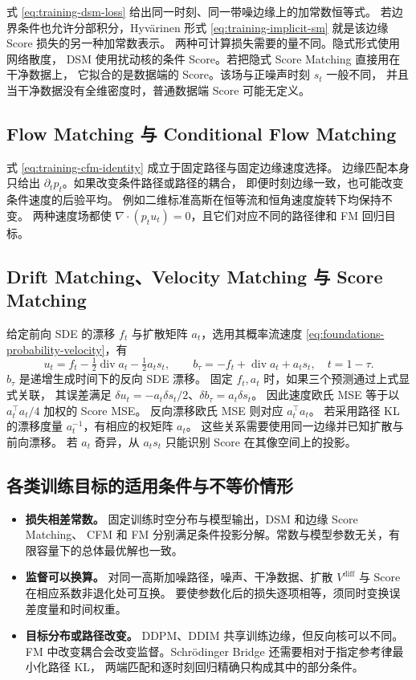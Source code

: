 式 \eqref{eq:training-dsm-loss} 给出同一时刻、同一带噪边缘上的加常数恒等式。
若边界条件也允许分部积分，Hyvärinen 形式 \eqref{eq:training-implicit-sm}
就是该边缘 Score 损失的另一种加常数表示。
两种可计算损失需要的量不同。隐式形式使用网络散度，
DSM 使用扰动核的条件 Score。若把隐式 Score Matching 直接用在干净数据上，
它拟合的是数据端的 Score。该场与正噪声时刻 \(s_t\) 一般不同，
并且当干净数据没有全维密度时，普通数据端 Score 可能无定义。

\subsection{Flow Matching 与 Conditional Flow Matching}

式 \eqref{eq:training-cfm-identity} 成立于固定路径与固定边缘速度选择。
边缘匹配本身只给出 \(\partial_t p_t\)。如果改变条件路径或路径的耦合，
即便时刻边缘一致，也可能改变条件速度的后验平均。
例如二维标准高斯在恒等流和恒角速度旋转下均保持不变。
两种速度场都使 \(\nabla\cdot(p_tu_t)=0\)，且它们对应不同的路径律和 FM 回归目标。

\subsection{Drift Matching、Velocity Matching 与 Score Matching}

给定前向 SDE 的漂移 \(f_t\) 与扩散矩阵 \(a_t\)，选用其概率流速度
\eqref{eq:foundations-probability-velocity}，有
\begin{equation}
  u_t=f_t-\tfrac12\operatorname{div}a_t-\tfrac12a_t s_t,
  \qquad
  b_\tau=-f_t+\operatorname{div}a_t+a_t s_t,\quad t=1-\tau .
  \label{eq:training-drift-score}
\end{equation}
\(b_\tau\) 是递增生成时间下的反向 SDE 漂移。
固定 \(f_t,a_t\) 时，如果三个预测通过上式显式关联，
其误差满足 \(\delta u_t=-a_t\delta s_t/2\)、\(\delta b_\tau=a_t\delta s_t\)。
因此速度欧氏 MSE 等于以 \(a_t^\top a_t/4\) 加权的 Score MSE。
反向漂移欧氏 MSE 则对应 \(a_t^\top a_t\)。
若采用路径 KL 的漂移度量 \(a_t^{-1}\)，有相应的权矩阵 \(a_t\)。
这些关系需要使用同一边缘并已知扩散与前向漂移。
若 \(a_t\) 奇异，从 \(a_t s_t\) 只能识别 Score 在其像空间上的投影。

\subsection{各类训练目标的适用条件与不等价情形}

\begin{itemize}[leftmargin=2em]
  \item \textbf{损失相差常数。} 固定训练时空分布与模型输出，DSM 和边缘 Score Matching、
    CFM 和 FM 分别满足条件投影分解。常数与模型参数无关，有限容量下的总体最优解也一致。
  \item \textbf{监督可以换算。} 对同一高斯加噪路径，噪声、干净数据、扩散
    \(V^{\mathrm{diff}}\) 与 Score 在相应系数非退化处可互换。
    要使参数化后的损失逐项相等，须同时变换误差度量和时间权重。
  \item \textbf{目标分布或路径改变。} DDPM、DDIM 共享训练边缘，但反向核可以不同。
    FM 中改变耦合会改变监督。Schrödinger Bridge 还需要相对于指定参考律最小化路径 KL，
    两端匹配和逐时刻回归精确只构成其中的部分条件。
\end{itemize}


